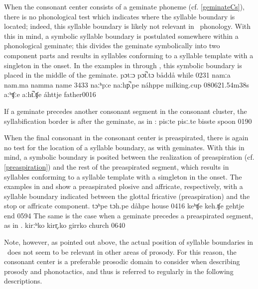 When the consonant center consists of a geminate phoneme (cf. \SEC\ref{geminateCs}), there is no phonological test which indicates where the syllable boundary is located; 
indeed, this syllable boundary is likely not relevant in \PS\ phonology. With this in mind, a symbolic syllable boundary is postulated somewhere within a phonological geminate; this divides the geminate symbolically into two component parts and results in syllables conforming to a syllable template with a singleton in the onset. In the examples in  through , this symbolic boundary is placed in the middle of the geminate.
	{pɔtːɔ}	{pɔt̚.tɔ}		{båddå}	{while\BS{}}		{0231}
	{namːa}	{nam.ma}		{namma}	{name\BS{}}		{3433}
	{naːʰpːe}	{naːhp̚.pe}	{náhppe}	{milking.cup\BS{}}	{080621}{.54m38s}
		{aːʰʧːe}	{aːht̚.ʧe}	{áhttje}	{father\BS{}}{0016}

If a geminate precedes another consonant segment in the consonant cluster, the syllabification border is after the geminate, as in :
	{pisːte}	{pisː.te}		{bisste}	{spoon\BS{}}		{0190}

When the final consonant in the consonant center is preaspirated, there is again no test for the location of a syllable boundary, as with geminates. With this in mind, a symbolic boundary is posited between the realization of preaspiration (cf. \SEC\ref{preaspiration}) and the rest of the preaspirated segment, which results in syllables conforming to a syllable template with a simgleton in the onset. The examples in  and  show a preaspirated plosive and affricate, respectively, with a syllable boundary indicated between the glottal fricative (preaspiration) and the stop or affricate component.
	{tɔʰpe}	{tɔh.pe}		{dåhpe}	{house\BS{}}		{0416}
		{keʰʧe}	{keh.ʧe}		{gehtje}	{end\BS{}}		{0594}
The same is the case when a geminate precedes a preaspirated segment, as in . %
	{kirːʰko}	{kirr̥.ko}		{girrko}	{church\BS{}}		{0640}

Note, however, as pointed out above, the actual position of syllable boundaries in \PS\ does not seem to be relevant in other areas of prosody. 
For this reason, the consonant center is a preferable prosodic domain to consider when describing prosody and phonotactics, and thus is referred to regularly in the following descriptions.



